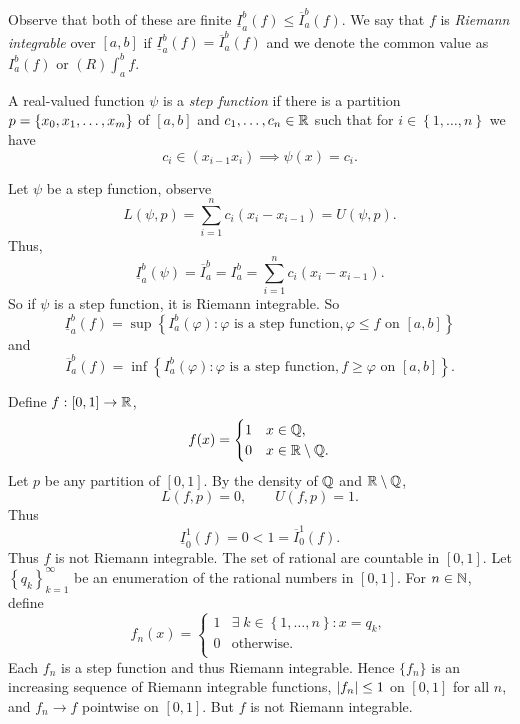 Observe that both of these are finite
$\underline I_a^b(f) \leq \overline I_a^b(f)$.
We say that $f$ is \emph{Riemann integrable} over $[a,b]$ if
$\underline I_a^b(f) = \overline I_a^b(f)$
and we denote the common value as $I_a^b(f)$ or 
$(R) \int_a^b f$.

\begin{definition}
	A real-valued function $\psi$ is a \emph{step function} if there is a
	partition $p = \left\{ x_0, x_1, \-\ldots, x_m \right\}$ of $[a,b]$
	and $c_1, \ldots, c_n \in \mathbb{R}$ such that for 
	$i \in \left\{ 1, \ldots, n \right\}$ we have
	\[
		c_i \in (x_{i-1} x_i) \implies \psi(x) = c_i.
	\]
\end{definition}

Let $\psi$ be a step function, observe 
\[
	L(\psi, p) = \sum_{i=1}^n c_i(x_i - x_{i-1}) = U(\psi, p).
\]
Thus,
\[
	\underline I_a^b(\psi)
	= \overline I_a^b 
	= I_a^b
	= \sum_{i=1}^n c_i(x_i - x_{i-1}).
\]
So if $\psi$ is a step function, it is Riemann integrable.
So
\[
	\underline I_a^b(f)
	=\sup\left\{I_a^b(\varphi): \text{$\varphi$ is a step function},
	\text{$\varphi \leq f$ on $[a,b]$}\right\}
\]
and
\[
	\overline I_a^b(f) = 
	\inf\left\{ I_a^b(\varphi):
	\text{$\varphi$ is a step function},
	\text{$f \geq \varphi$ on $[a,b]$} \right\}.
\]

\begin{example}
	Define $f: [0,1] \to \mathbb{R}$,
	\[
		f(x) = \begin{cases}
			1 & x \in \mathbb{Q}, \\
			0 & x \in \mathbb{R} \setminus \mathbb{Q}. \\
		\end{cases}
	\]
	Let $p$ be any partition of $[0,1]$.
	By the density of $\mathbb{Q}$ and $\mathbb{R} \setminus \mathbb{Q}$,
	\[
		L(f,p) = 0, \qquad U(f,p) =1.
	\]
	Thus
	\[
		\underline I_0^1(f) = 0 < 1 = \overline I_0^1(f).
	\]
	Thus $f$ is not Riemann integrable.
	The set of rational are countable in $[0,1]$.
	Let $\left\{ q_k \right\}_{k=1}^\infty$ be an enumeration of the
	rational numbers in $[0,1]$.
	For $n \in \mathbb{N}$, define
	\[
		f_n(x) =
		\begin{cases}
			1 & \exists\; k \in \left\{ 1, \ldots, n \right\}: x = q_k, \\
			0 & \text{otherwise}. \\
		\end{cases}
	\]
	Each $f_n$ is a step function and thus Riemann integrable.
	Hence $\{f_n\}$ is an increasing sequence of Riemann integrable functions,
	$\left\lvert f_n \right\rvert \leq 1$ on $[0,1]$ for all $n$, and $f_n \to f$ pointwise
	on $[0,1]$.
	But $f$ is not Riemann integrable.
\end{example}